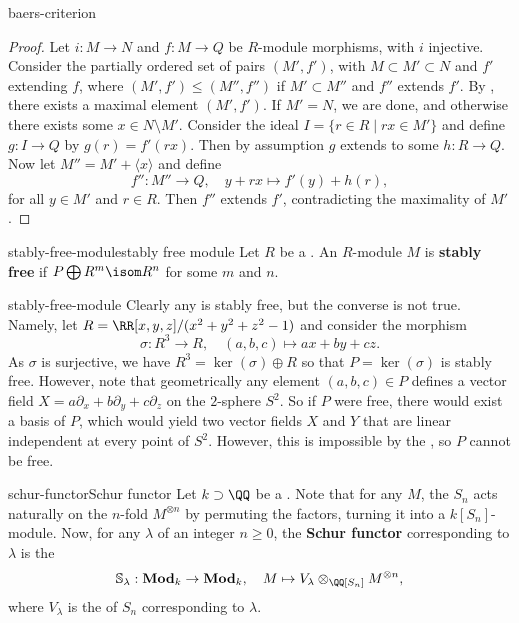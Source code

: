 \begin{example}{baers-criterion}
    \begin{proof}
        Let $i : M \to N$ and $f : M \to Q$ be $R$-module morphisms, with $i$ injective. Consider the partially ordered set of pairs $(M', f')$, with $M \subset M' \subset N$ and $f'$ extending $f$, where $(M', f') \le (M'', f'')$ if $M' \subset M''$ and $f''$ extends $f'$. By , there exists a maximal element $(M', f')$. If $M' = N$, we are done, and otherwise there exists some $x \in N \setminus M'$. Consider the ideal $I = \{ r \in R \mid rx \in M' \}$ and define $g : I \to Q$ by $g(r) = f'(rx)$. Then by assumption $g$ extends to some $h : R \to Q$. Now let $M'' = M' + \langle x \rangle$ and define
        \[ f'' : M'' \to Q, \quad y + rx \mapsto f'(y) + h(r) , \]
        for all $y \in M'$ and $r \in R$. Then $f''$ extends $f'$, contradicting the maximality of $M'$.
    \end{proof}
\end{example}

\begin{topic}{stably-free-module}{stably free module}
    Let $R$ be a . An $R$-module $M$ is \textbf{stably free} if $P \bigoplus R^m \isom R^n$ for some $m$ and $n$.
\end{topic}

\begin{example}{stably-free-module}
    Clearly any  is stably free, but the converse is not true. Namely, let $R = \RR[x, y, z] / (x^2 + y^2 + z^2 - 1)$ and consider the morphism
    \[ \sigma : R^3 \to R, \quad (a, b, c) \mapsto ax + by + cz . \]
    As $\sigma$ is surjective, we have $R^3 = \ker(\sigma) \oplus R$ so that $P = \ker(\sigma)$ is stably free. However, note that geometrically any element $(a, b, c) \in P$ defines a vector field $X = a \partial_x + b \partial_y + c \partial_z$ on the $2$-sphere $S^2$. So if $P$ were free, there would exist a basis of $P$, which would yield two vector fields $X$ and $Y$ that are linear independent at every point of $S^2$. However, this is impossible by the , so $P$ cannot be free.
\end{example}

\begin{topic}{schur-functor}{Schur functor}
    Let $k \supset \QQ$ be a . Note that for any  $M$, the  $S_n$ acts naturally on the $n$-fold  $M^{\otimes n}$ by permuting the factors, turning it into a $k[S_n]$-module. Now, for any  $\lambda$ of an integer $n \ge 0$, the \textbf{Schur functor} corresponding to $\lambda$ is the 
    \[ \mathbb{S}_\lambda : \textbf{Mod}_k \to \textbf{Mod}_k, \quad M \mapsto V_\lambda \otimes_{\QQ[S_n]} M^{\otimes n} , \]
    where $V_\lambda$ is the   of $S_n$ corresponding to $\lambda$.
\end{topic}

